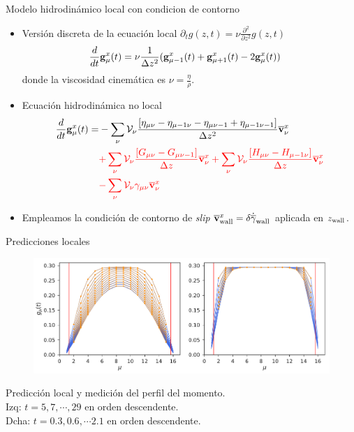 \documentclass{beamer}
\begin{document}
\begin{frame}{Modelo hidrodinámico local con condicion de contorno}  
  \begin{itemize}
    \item<1-> Versión discreta de la ecuación local $\partial_t g(z,t)=\nu\frac{\partial^2}{\partial z^2} g(z,t)$
\begin{align}
  \frac{d}{dt}{\bf g}^x_\mu(t)&=\nu \frac{1}{\Delta z^2}({\bf g}^x_{\mu-1}(t)+{\bf g}^x_{\mu+1}(t)-2{\bf g}^x_{\mu}(t))
\nonumber
\end{align}
donde la viscosidad cinemática es $\nu=\frac{\eta}{\rho}$.
    \item<2-> Ecuación hidrodinámica no local 
\begin{align}
  \frac{d}{dt}{\bf g}^x_\mu(t)=&
-\sum_{\nu} {\cal V}_\nu \frac{\left[\eta_{\mu\nu}-\eta_{\mu-1\nu}-\eta_{\mu\nu-1}+\eta_{\mu-1\nu-1}\right]}{\Delta z^2}\overline{\bf v}^x_\nu \nonumber \\
  &{\color{red}+\sum_{\nu} {\cal V}_\nu\frac{\left[G_{\mu\nu}-G_{\mu\nu-1}\right]}{\Delta z}\overline{\bf v}^x_\nu
+\sum_{\nu} {\cal V}_\nu\frac{\left[H_{\mu\nu}-H_{\mu-1\nu}\right]}{\Delta z}
  \overline{\bf v}^x_\nu}
\nonumber \\
  &{\color{red}-\sum_{\nu} {\cal V}_\nu\gamma_{\mu\nu}\overline{\bf v}^x_\nu}
\nonumber
\end{align}
\item<3-> Empleamos la condición de contorno de \textit{slip} $\overline{\bf v}_{\rm wall}^x=\delta \dot{\overline{\gamma}}_{\rm wall}$ aplicada en $z_{\rm wall}$.
  \end{itemize}
\end{frame}



\begin{frame}{Predicciones locales}
\begin{figure}[]
\includegraphics[width=\linewidth]{gxtLocalPrediction-17nodes-WALLS}
\end{figure}
  {\color{orange} Predicción local}
  y {\color{blue} medición} del perfil del momento.\\
  Izq: $t=5,7,\cdots,29$  en orden descendente.\\
  Dcha: $t=0.3,0.6,\cdots2.1$ en orden descendente.
\end{frame}
\end{document}
